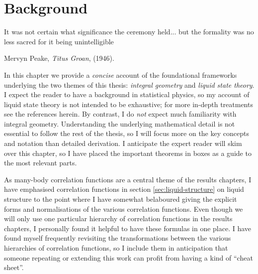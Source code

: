 \documentclass[11pt,twoside]{report}
\def\includebibliography{}
\begin{document}
\chapter{Background}
\epigraph{It was not certain what significance the ceremony held... but the formality was no less sacred for it being unintelligible}{Mervyn Peake, \emph{Titus Groan}, (1946).}

In this chapter we provide a \emph{concise} account of the foundational frameworks underlying the two themes of this thesis: \emph{integral geometry} and \emph{liquid state theory}.
I expect the reader to have a background in statistical physics, so my account of liquid state theory is not intended to be exhaustive; for more in-depth treatments see the references herein.
By contrast, I do \emph{not} expect much familiarity with integral geometry.
Understanding the underlying mathematical detail is not essential to follow the rest of the thesis, so I will focus more on the key concepts and notation than detailed derivation.
I anticipate the expert reader will skim over this chapter, so I have placed the important theorems in boxes as a guide to the most relevant parts.

As many-body correlation functions are a central theme of the results chapters, I have emphasised correlation functions in section \ref{sec:liquid-structure} on liquid structure to the point where I have somewhat belaboured giving the explicit forms and normalisations of the various correlation functions.
Even though we will only use one particular hierarchy of correlation functions in the results chapters, I personally found it helpful to have these formulas in one place.
I have found myself frequently revisiting the transformations between the various hierarchies of correlation functions, so I include them in anticipation that someone repeating or extending this work can profit from having a kind of ``cheat sheet''.






\ifdefined\includebibliography
  \printbibliography
\fi
\end{document}
